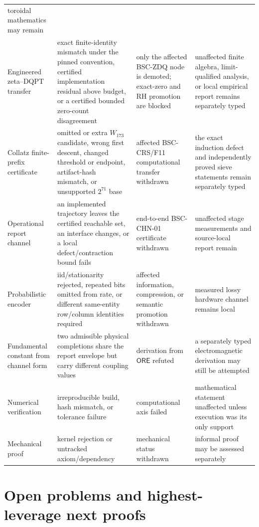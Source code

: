 \documentclass[11pt,a4paper]{article}
\theoremstyle{definition}
\theoremstyle{plain}
\theoremstyle{remark}
\begin{document}
\begin{longtable}{L{0.19\textwidth}L{0.25\textwidth}L{0.22\textwidth}L{0.23\textwidth}}
toroidal mathematics may remain\\
Engineered zeta--DQPT transfer & exact finite-identity mismatch under the
pinned convention, certified implementation residual above budget, or a
certified bounded zero-count disagreement & only the affected BSC-ZDQ node is
demoted; exact-zero and RH promotion are blocked & unaffected finite algebra,
limit-qualified analysis, or local empirical report remains separately typed\\
Collatz finite-prefix certificate & omitted or extra \(W_{173}\) candidate,
wrong first descent, changed threshold or endpoint, artifact-hash mismatch,
or unsupported \(2^{71}\) base & affected BSC-CRS/F11 computational transfer
withdrawn & the exact induction defect and independently proved sieve
statements remain separately typed\\
Operational report channel & an implemented trajectory leaves the certified
reachable set, an interface changes, or a local defect/contraction bound fails
& end-to-end BSC-CHN-01 certificate withdrawn & unaffected stage measurements
and source-local report remain\\
Probabilistic encoder & iid/stationarity rejected, repeated bits omitted from
rate, or different same-entity row/column identities required & affected
information, compression, or semantic promotion withdrawn & measured lossy
hardware channel remains local\\
Fundamental constant from channel form & two admissible physical completions
share the report envelope but carry different coupling values & derivation
from \(\mathsf{ORE}\) refuted & a separately typed electromagnetic derivation
may still be attempted\\
Numerical verification & irreproducible build, hash mismatch, or tolerance
failure & computational axis failed & mathematical statement unaffected unless
execution was its only support\\
Mechanical proof & kernel rejection or untracked axiom/dependency & mechanical
status withdrawn & informal proof may be assessed separately\\
\bottomrule
\end{longtable}
\endgroup

\section{Open problems and highest-leverage next proofs}\label{sec:openproblems}
\end{document}
